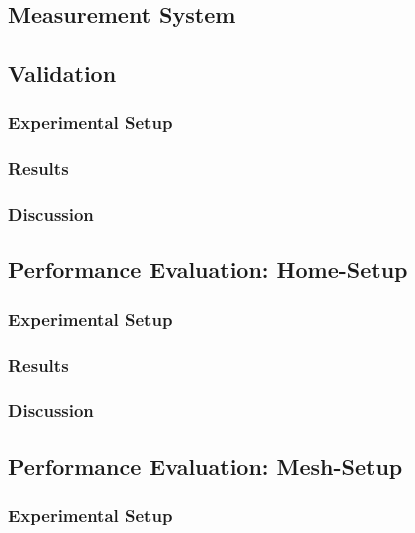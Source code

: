 \documentclass{sig-alternate}
\begin{document}
		\subsection{Measurement System}
		\label{s:measurement-system}

		\subsection{Validation}
		\label{s:validation}

			\subsubsection{Experimental Setup}
			
			\subsubsection{Results}

			\subsubsection{Discussion}

		\subsection{Performance Evaluation: Home-Setup}
		\label{s:evaluation}

			\subsubsection{Experimental Setup}

			\subsubsection{Results}

			\subsubsection{Discussion}

		\subsection{Performance Evaluation: Mesh-Setup}
		\label{s:evaluation}

			\subsubsection{Experimental Setup}
\end{document}
